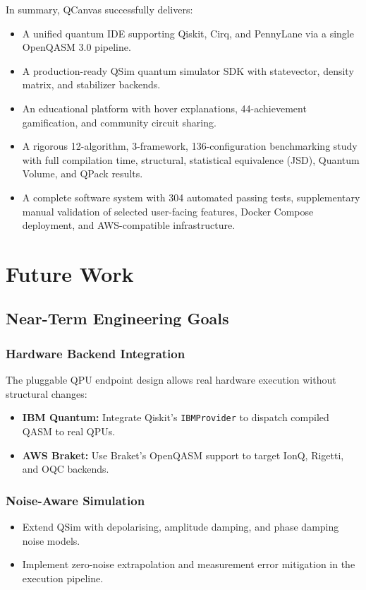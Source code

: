 In summary, QCanvas successfully delivers:
\begin{itemize}
    \item A unified quantum IDE supporting Qiskit, Cirq, and PennyLane via a single OpenQASM 3.0 pipeline.
    \item A production-ready QSim quantum simulator SDK with statevector, density matrix, and stabilizer backends.
    \item An educational platform with hover explanations, 44-achievement gamification, and community circuit sharing.
    \item A rigorous 12-algorithm, 3-framework, 136-configuration benchmarking study with full compilation time, structural, statistical equivalence (JSD), Quantum Volume, and QPack results.
    \item A complete software system with 304 automated passing tests, supplementary manual validation of selected user-facing features, Docker Compose deployment, and AWS-compatible infrastructure.
\end{itemize}

\section{Future Work}

\subsection{Near-Term Engineering Goals}

\subsubsection{Hardware Backend Integration}
The pluggable QPU endpoint design allows real hardware execution without structural changes:
\begin{itemize}
    \item \textbf{IBM Quantum:} Integrate Qiskit's \texttt{IBMProvider} to dispatch compiled QASM to real QPUs.
    \item \textbf{AWS Braket:} Use Braket's OpenQASM support to target IonQ, Rigetti, and OQC backends.
\end{itemize}

\subsubsection{Noise-Aware Simulation}
\begin{itemize}
    \item Extend QSim with depolarising, amplitude damping, and phase damping noise models.
    \item Implement zero-noise extrapolation and measurement error mitigation in the execution pipeline.
\end{itemize}


